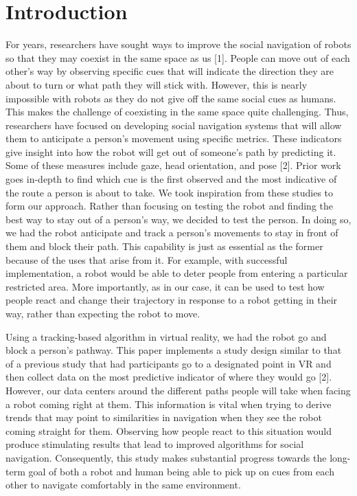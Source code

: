 \documentclass[letterpaper, 10 pt, conference]{ieeeconf}
\begin{document}
\section{Introduction}
For years, researchers have sought ways to improve the social navigation of robots so that they may coexist in the same space as us [1]. People can move out of each other's way by observing specific cues that will indicate the direction they are about to turn or what path they will stick with. However, this is nearly impossible with robots as they do not give off the same social cues as humans. This makes the challenge of coexisting in the same space quite challenging. Thus, researchers have focused on developing social navigation systems that will allow them to anticipate a person's movement using specific metrics. These indicators give insight into how the robot will get out of someone's path by predicting it. Some of these measures include gaze, head orientation, and pose [2]. Prior work goes in-depth to find which cue is the first observed and the most indicative of the route a person is about to take. We took inspiration from these studies to form our approach. Rather than focusing on testing the robot and finding the best way to stay out of a person's way, we decided to test the person. In doing so, we had the robot anticipate and track a person's movements to stay in front of them and block their path. This capability is just as essential as the former because of the uses that arise from it. For example, with successful implementation, a robot would be able to deter people from entering a particular restricted area. More importantly, as in our case, it can be used to test how people react and change their trajectory in response to a robot getting in their way, rather than expecting the robot to move. 
    
    Using a tracking-based algorithm in virtual reality, we had the robot go and block a person's pathway. This paper implements a study design similar to that of a previous study that had participants go to a designated point in VR and then collect data on the most predictive indicator of where they would go [2]. However, our data centers around the different paths people will take when facing a robot coming right at them. This information is vital when trying to derive trends that may point to similarities in navigation when they see the robot coming straight for them. Observing how people react to this situation would produce stimulating results that lead to improved algorithms for social navigation. Consequently, this study makes substantial progress towards the long-term goal of both a robot and human being able to pick up on cues from each other to navigate comfortably in the same environment.
\end{document}
